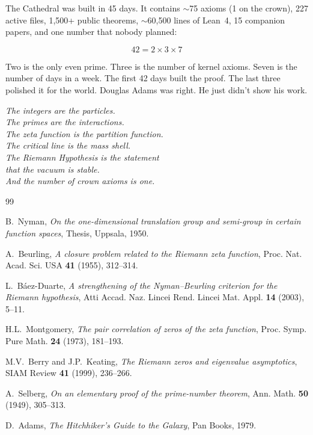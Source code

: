 \documentclass[11pt,a4paper]{article}
\begin{document}
The Cathedral was built in 45 days. It contains $\sim$75 axioms
(1 on the crown), 227 active files,
1{,}500+ public theorems, $\sim$60{,}500 lines of Lean~4, 15 companion papers,
and one number that nobody planned:

\[
  42 = 2 \times 3 \times 7
\]

Two is the only even prime. Three is the number of kernel axioms.
Seven is the number of days in a week.
The first 42 days built the proof. The last three polished it for
the world. Douglas Adams was right. He just didn't show his work.

\vspace{1cm}
\begin{flushright}
\emph{The integers are the particles.}\\
\emph{The primes are the interactions.}\\
\emph{The zeta function is the partition function.}\\
\emph{The critical line is the mass shell.}\\
\emph{The Riemann Hypothesis is the statement}\\
\emph{that the vacuum is stable.}\\[0.5cm]
\emph{And the number of crown axioms is one.}
\end{flushright}

\vspace{1cm}

\begin{thebibliography}{99}

B.~Nyman, \emph{On the one-dimensional translation group and semi-group in
certain function spaces}, Thesis, Uppsala, 1950.

A.~Beurling, \emph{A closure problem related to the Riemann zeta function},
Proc. Nat. Acad. Sci. USA \textbf{41} (1955), 312--314.

L.~B\'aez-Duarte, \emph{A strengthening of the Nyman--Beurling criterion for
the Riemann hypothesis}, Atti Accad. Naz. Lincei Rend. Lincei Mat. Appl.
\textbf{14} (2003), 5--11.

H.L.~Montgomery, \emph{The pair correlation of zeros of the zeta function},
Proc. Symp. Pure Math. \textbf{24} (1973), 181--193.

M.V.~Berry and J.P.~Keating, \emph{The Riemann zeros and eigenvalue
asymptotics}, SIAM Review \textbf{41} (1999), 236--266.

A.~Selberg, \emph{On an elementary proof of the prime-number theorem},
Ann. Math. \textbf{50} (1949), 305--313.

D.~Adams, \emph{The Hitchhiker's Guide to the Galaxy},
Pan Books, 1979.

\end{thebibliography}
\end{document}
